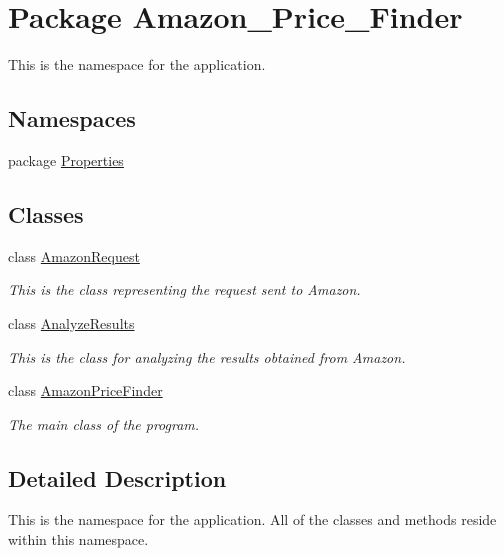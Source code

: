 \hypertarget{namespace_amazon___price___finder}{\section{Package Amazon\-\_\-\-Price\-\_\-\-Finder}
\label{namespace_amazon___price___finder}
}


This is the namespace for the application.  


\subsection*{Namespaces}
\begin{DoxyCompactItemize}
\item 
package \hyperlink{namespace_amazon___price___finder_1_1_properties}{Properties}
\end{DoxyCompactItemize}
\subsection*{Classes}
\begin{DoxyCompactItemize}
\item 
class \hyperlink{class_amazon___price___finder_1_1_amazon_request}{Amazon\-Request}
\begin{DoxyCompactList}\small\item\em This is the class representing the request sent to Amazon. \end{DoxyCompactList}\item 
class \hyperlink{class_amazon___price___finder_1_1_analyze_results}{Analyze\-Results}
\begin{DoxyCompactList}\small\item\em This is the class for analyzing the results obtained from Amazon. \end{DoxyCompactList}\item 
class \hyperlink{class_amazon___price___finder_1_1_amazon_price_finder}{Amazon\-Price\-Finder}
\begin{DoxyCompactList}\small\item\em The main class of the program. \end{DoxyCompactList}\end{DoxyCompactItemize}


\subsection{Detailed Description}
This is the namespace for the application. All of the classes and methods reside within this namespace. 
